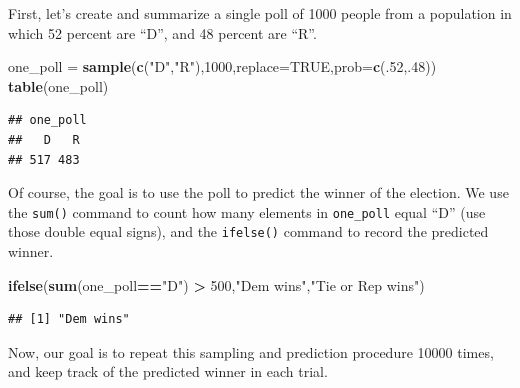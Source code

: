 \documentclass[
]{book}
\newenvironment{Shaded}{\begin{snugshade}}{\end{snugshade}}
\newcommand{\AttributeTok}[1]{\textcolor[rgb]{0.13,0.29,0.53}{#1}}
\newcommand{\ConstantTok}[1]{\textcolor[rgb]{0.56,0.35,0.01}{#1}}
\newcommand{\DecValTok}[1]{\textcolor[rgb]{0.00,0.00,0.81}{#1}}
\newcommand{\FunctionTok}[1]{\textcolor[rgb]{0.13,0.29,0.53}{\textbf{#1}}}
\newcommand{\NormalTok}[1]{#1}
\newcommand{\OtherTok}[1]{\textcolor[rgb]{0.56,0.35,0.01}{#1}}
\newcommand{\SpecialCharTok}[1]{\textcolor[rgb]{0.81,0.36,0.00}{\textbf{#1}}}
\newcommand{\StringTok}[1]{\textcolor[rgb]{0.31,0.60,0.02}{#1}}
\theoremstyle{definition}
\theoremstyle{definition}
\theoremstyle{definition}
\theoremstyle{definition}
\theoremstyle{remark}
\begin{document}
First, let's create and summarize a single poll of 1000 people from a population in which 52 percent are ``D'', and 48 percent are ``R''.

\begin{Shaded}
\begin{Highlighting}[]
\NormalTok{one\_poll }\OtherTok{=} \FunctionTok{sample}\NormalTok{(}\FunctionTok{c}\NormalTok{(}\StringTok{"D"}\NormalTok{,}\StringTok{"R"}\NormalTok{),}\DecValTok{1000}\NormalTok{,}\AttributeTok{replace=}\ConstantTok{TRUE}\NormalTok{,}\AttributeTok{prob=}\FunctionTok{c}\NormalTok{(.}\DecValTok{52}\NormalTok{,.}\DecValTok{48}\NormalTok{))}
\FunctionTok{table}\NormalTok{(one\_poll)}
\end{Highlighting}
\end{Shaded}

\begin{verbatim}
## one_poll
##   D   R 
## 517 483
\end{verbatim}

Of course, the goal is to use the poll to predict the winner of the election.
We use the \texttt{sum()} command to count how many elements in \texttt{one\_poll} equal ``D'' (use those double equal signs), and the \texttt{ifelse()} command to record the predicted winner.

\begin{Shaded}
\begin{Highlighting}[]
\FunctionTok{ifelse}\NormalTok{(}\FunctionTok{sum}\NormalTok{(one\_poll}\SpecialCharTok{==}\StringTok{"D"}\NormalTok{) }\SpecialCharTok{\textgreater{}} \DecValTok{500}\NormalTok{,}\StringTok{"Dem wins"}\NormalTok{,}\StringTok{"Tie or Rep wins"}\NormalTok{)}
\end{Highlighting}
\end{Shaded}

\begin{verbatim}
## [1] "Dem wins"
\end{verbatim}

Now, our goal is to repeat this sampling and prediction procedure 10000 times, and keep track of the predicted winner in each trial.
\end{document}
